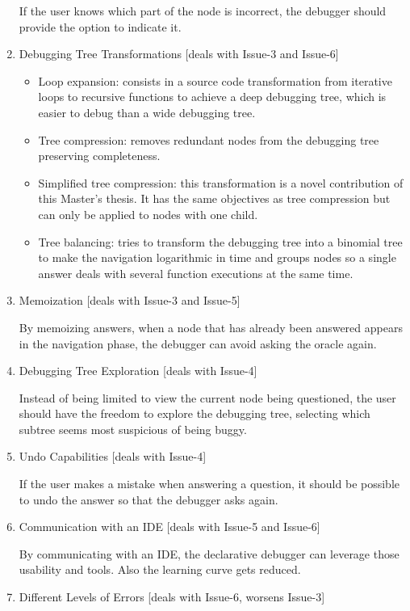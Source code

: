 \begin{enumerate}
If the user knows which part of the node is incorrect, the debugger should provide the option to indicate it.
\item Debugging Tree Transformations [deals with Issue-3 and Issue-6]

\begin{itemize}
    \item Loop expansion: consists in a source code transformation from iterative loops to recursive functions to achieve a deep debugging tree, which is easier to debug than a wide debugging tree.
    \item Tree compression: removes redundant nodes from the debugging tree preserving completeness.
    \item Simplified tree compression: this transformation is a novel contribution of this Master's thesis. It has the same objectives as tree compression but can only be applied to nodes with one child.
    \item Tree balancing: tries to transform the debugging tree into a binomial tree to make the navigation logarithmic in time and groups nodes so a single answer deals with several function executions at the same time.
\end{itemize}

    \item Memoization [deals with Issue-3 and Issue-5]

By memoizing answers, when a node that has already been answered appears in the navigation phase, the debugger can avoid asking the oracle again.
\item Debugging Tree Exploration [deals with Issue-4]

Instead of being limited to view the current node being questioned, the user should have the freedom to explore the debugging tree, selecting which subtree seems most suspicious of being buggy.
\item Undo Capabilities [deals with Issue-4]

If the user makes a mistake when answering a question, it should be possible to undo the answer so that the debugger asks again.
\item Communication with an IDE [deals with Issue-5 and Issue-6]

By communicating with an IDE, the declarative debugger can leverage those usability and tools. Also the learning curve gets reduced.
\item Different Levels of Errors [deals with Issue-6, worsens Issue-3]


\end{enumerate}
